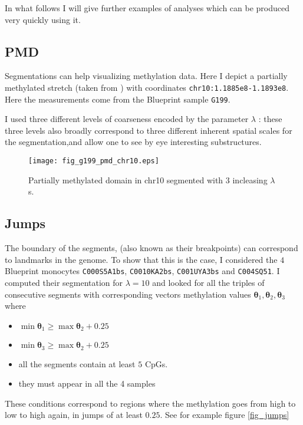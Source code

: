 \documentclass[12pt]{amsart}
\begin{document}
In what follows I will give further examples of analyses 
which can be 
produced very quickly using it. 

\subsection{PMD}

Segmentations can help visualizing methylation data. Here I 
depict a partially methylated stretch (taken from \cite{pmd})
 with coordinates 
\texttt{chr10:1.1885e8-1.1893e8}. Here the measurements come 
from the Blueprint sample \texttt{G199}. 

I used three different levels of coarseness encoded by the parameter $\lambda$ : 
these three levels also broadly correspond to three different inherent 
spatial scales for the segmentation,and allow one to 
see by eye interesting substructures. 

\begin{figure}\label{fig_g199_pmd_chr10.eps}
\texttt{[image: fig\_g199\_pmd\_chr10.eps]}
\caption{Partially methylated domain in chr10 segmented with $3$ incleasing $\lambda$s.}
\end{figure}

\subsection{Jumps}

The boundary of the segments, (also known as their breakpoints)
can correspond to landmarks in the genome. To show that this is the case, 
I considered the 
$4$ Blueprint monocytes \texttt{C000S5A1bs}, \texttt{C0010KA2bs},
\texttt{C001UYA3bs} and \texttt{C004SQ51}.
I computed their segmentation for $\lambda=10$ and looked for all the triples of 
consecutive segments
with corresponding vectors methylation values 
$\pmb{\theta}_{1},\pmb{\theta}_{2},\pmb{\theta}_{3}$
where 
\begin{itemize}
\item{} $\min \pmb{\theta}_1 \geq \max \pmb{\theta}_2 + 0.25$
\item{} $\min \pmb{\theta}_{3} \geq \max \pmb{\theta}_2 + 0.25$
\item{} all the segments contain at least $5$ CpGs.
\item{} they must appear in all the 4 samples
\end{itemize}

These conditions correspond to regions where the methylation goes from 
high to low to high again,
in jumps of at least $0.25$.
See for example figure \ref{fig_jumps} 
\end{document}
